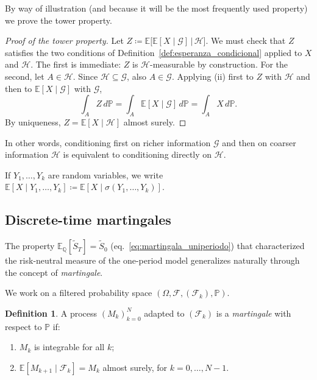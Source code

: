 \documentclass[11pt,a4paper,oneside]{report}
\theoremstyle{plain}
\theoremstyle{definition}
\newtheorem{definicion}[teorema]{Definition}
\theoremstyle{remark}
\newcommand{\E}{\mathbb{E}}
\newcommand{\PP}{\mathbb{P}}
\newcommand{\Q}{\mathbb{Q}}
\newcommand{\F}{\mathcal{F}}
\newcommand{\G}{\mathcal{G}}
\newcommand{\HH}{\mathcal{H}}
\newcommand{\1}{\mathbf{1}}
\newcommand{\eqdef}{\coloneqq}
\begin{document}
By way of illustration (and because it will be the most frequently
used property) we prove the tower property.

\begin{proof}[Proof of the tower property]
Let $Z \eqdef \E\bigl[\E[X \mid \G] \,\big|\, \HH\bigr]$. We must
check that $Z$ satisfies the two conditions of
Definition~\ref{def:esperanza_condicional} applied to $X$ and $\HH$.
The first is immediate: $Z$ is $\HH$-measurable by construction. For
the second, let $A \in \HH$. Since $\HH \subseteq \G$, also $A \in \G$.
Applying (ii) first to $Z$ with $\HH$ and then to $\E[X \mid \G]$ with
$\G$,
\begin{equation*}
  \int_A Z \, d\PP = \int_A \E[X \mid \G] \, d\PP = \int_A X \, d\PP.
\end{equation*}
By uniqueness, $Z = \E[X \mid \HH]$ almost surely.
\end{proof}

In other words,
conditioning first on richer information $\G$ and then on coarser
information $\HH$ is equivalent to conditioning directly on $\HH$.

If $Y_1, \ldots, Y_k$ are random
variables, we write $\E[X \mid Y_1, \ldots, Y_k] \eqdef
\E[X \mid \sigma(Y_1, \ldots, Y_k)]$.

\subsection{Discrete-time martingales}
\label{subsec:martingalas_discretas}

The property $\E_\Q[\widetilde S_T] = \widetilde S_0$
(eq.~\eqref{eq:martingala_uniperiodo}) that characterized the
risk-neutral measure of the one-period model generalizes naturally
through the concept of \emph{martingale}.

We work on a
filtered probability space $(\Omega, \F, (\F_k), \PP)$.

\begin{definicion}
\label{def:martingala}
A process $(M_k)_{k=0}^{N}$ adapted to $(\F_k)$ is a
\emph{martingale} with respect to $\PP$ if:
\begin{enumerate}[label=\textnormal{(\roman*)}]
  \item $M_k$ is integrable for all $k$;
  \item $\E[M_{k+1} \mid \F_k] = M_k$ almost surely, for $k = 0,
        \ldots, N-1$.
\end{enumerate}
\end{definicion}
\end{document}
